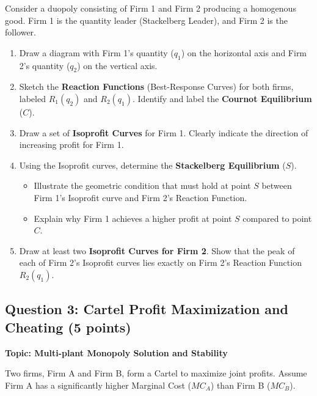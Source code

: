 \documentclass[12pt, a4paper]{article}
\begin{document}
Consider a duopoly consisting of Firm 1 and Firm 2 producing a homogenous good. Firm 1 is the quantity leader (Stackelberg Leader), and Firm 2 is the follower.

\begin{enumerate}
    \item[(a)] Draw a diagram with Firm 1's quantity ($q_1$) on the horizontal axis and Firm 2's quantity ($q_2$) on the vertical axis.
    \item[(b)] Sketch the \textbf{Reaction Functions} (Best-Response Curves) for both firms, labeled $R_1(q_2)$ and $R_2(q_1)$. Identify and label the \textbf{Cournot Equilibrium} ($C$).
    \item[(c)] Draw a set of \textbf{Isoprofit Curves} for Firm 1. Clearly indicate the direction of increasing profit for Firm 1.
    \item[(d)] Using the Isoprofit curves, determine the \textbf{Stackelberg Equilibrium} ($S$).
    \begin{itemize}
        \item Illustrate the geometric condition that must hold at point $S$ between Firm 1's Isoprofit curve and Firm 2's Reaction Function.
        \item Explain why Firm 1 achieves a higher profit at point $S$ compared to point $C$.
    \end{itemize}
    \item[(e)] Draw at least two \textbf{Isoprofit Curves for Firm 2}. Show that the peak of each of Firm 2's Isoprofit curves lies exactly on Firm 2's Reaction Function $R_2(q_1)$.
\end{enumerate}

\vspace{0.5cm}

\subsection*{Question 3: Cartel Profit Maximization and Cheating (5 points)}
\textbf{Topic: Multi-plant Monopoly Solution and Stability}

Two firms, Firm A and Firm B, form a Cartel to maximize joint profits. Assume Firm A has a significantly higher Marginal Cost ($MC_A$) than Firm B ($MC_B$).
\end{document}
